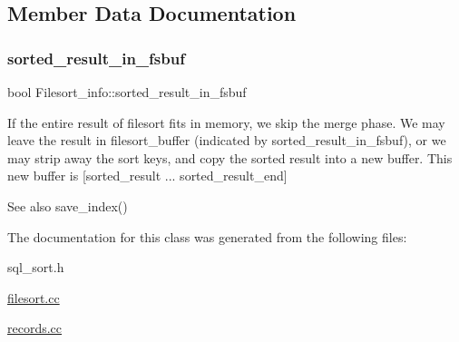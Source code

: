 \subsection{Member Data Documentation}
\mbox{\label{classFilesort__info_a8d5e64f11beecff6917933a6aed9f475}} 
\subsubsection{\texorpdfstring{sorted\+\_\+result\+\_\+in\+\_\+fsbuf}{sorted\_result\_in\_fsbuf}}
{\footnotesize\ttfamily bool Filesort\+\_\+info\+::sorted\+\_\+result\+\_\+in\+\_\+fsbuf}

If the entire result of filesort fits in memory, we skip the merge phase. We may leave the result in filesort\+\_\+buffer (indicated by sorted\+\_\+result\+\_\+in\+\_\+fsbuf), or we may strip away the sort keys, and copy the sorted result into a new buffer. This new buffer is \mbox{[}sorted\+\_\+result ... sorted\+\_\+result\+\_\+end\mbox{]} \begin{DoxySeeAlso}{See also}
save\+\_\+index() 
\end{DoxySeeAlso}


The documentation for this class was generated from the following files\+:\begin{DoxyCompactItemize}
\item 
sql\+\_\+sort.\+h\item 
\mbox{\hyperlink{filesort_8cc}{filesort.\+cc}}\item 
\mbox{\hyperlink{records_8cc}{records.\+cc}}\end{DoxyCompactItemize}
